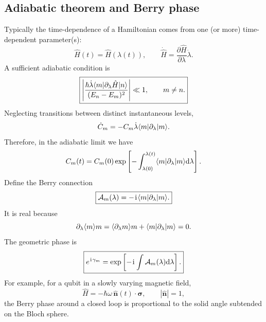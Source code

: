 \subsection{Adiabatic theorem and Berry phase}
Typically the time-dependence of a Hamiltonian comes from one (or more) time-dependent parameter(s):
\begin{equation}
\hat H(t)=\hat H(\lambda(t)),
\qquad
\dot{\hat H}=\frac{\partial\hat H}{\partial\lambda}\dot\lambda.
\end{equation}
A sufficient adiabatic condition is
\begin{equation}
\boxed{
\left|\frac{\hbar\dot\lambda
\langle{m}|\partial_\lambda\hat H|{n}\rangle}
{(E_n-E_m)^2}\right|\ll1,
\qquad m\neq n.}
\end{equation}
Neglecting transitions between distinct instantaneous levels,
\begin{equation}
\dot C_m=-C_m\dot\lambda
\langle{m}|\partial_\lambda|{m}\rangle.
\end{equation}
Therefore, in the adiabatic limit we have
\begin{equation}
C_m(t)=C_m(0)
\exp\left[-\int_{\lambda(0)}^{\lambda(t)}
\langle{m}|\partial_\lambda|{m}\rangle\mathrm{d}\lambda\right].
\end{equation}
Define the Berry connection
\begin{equation}
\boxed{\mathcal A_m(\lambda)
=-\hspace{1pt}\mathrm{i}\hspace{1pt}\langle{m}|\partial_\lambda|{m}\rangle.}
\end{equation}
It is real because
\begin{equation}
\partial_\lambda\langle{m}\rangle m
=\langle{\partial_\lambda m}\rangle{m}
+\langle{m}|\partial_\lambda|{m}\rangle=0.
\end{equation}
The geometric phase is
\begin{equation}
\boxed{e^{\hspace{1pt}\mathrm{i}\hspace{1pt}\gamma_m}
=\exp\left[-\hspace{1pt}\mathrm{i}\hspace{1pt}\int\mathcal A_m(\lambda)\mathrm{d}\lambda\right].}
\end{equation}
For example, for a qubit in a slowly varying magnetic field,
\begin{equation}
\hat H=-\hbar\omega\,\hat{\bm n}(t)\cdot\bm\sigma,
\qquad |\hat{\bm n}|=1,
\end{equation}
the Berry phase around a closed loop is proportional to the solid angle
subtended on the Bloch sphere.


